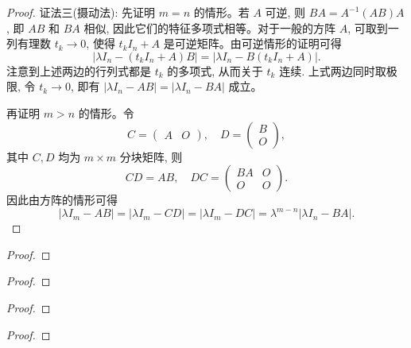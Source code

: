 \documentclass[lang=cn,newtx,10pt,scheme=chinese]{elegantbook}
\begin{document}
\begin{proof}
{\color{blue}证法三(摄动法):} 先证明 \(m = n\) 的情形。若 \(A\) 可逆, 则 \(BA = A^{-1}(AB)A\), 即 \(AB\) 和 \(BA\) 相似, 因此它们的特征多项式相等。对于一般的方阵 \(A\), 可取到一列有理数 \(t_k \to 0\), 使得 \(t_k I_n + A\) 是可逆矩阵。由可逆情形的证明可得
\[
|\lambda I_n - (t_k I_n + A)B| = |\lambda I_n - B(t_k I_n + A)|.
\]
注意到上述两边的行列式都是 \( t_k \) 的多项式, 从而关于 \( t_k \) 连续. 上式两边同时取极限, 令 \( t_k \to 0 \), 即有
\(
|\lambda I_n - AB| = |\lambda I_n - BA|
\)
成立。

再证明 \( m > n \) 的情形。令
\[
C = \begin{pmatrix}
A & O
\end{pmatrix}, \quad D = \begin{pmatrix}
B \\
O
\end{pmatrix},
\]
其中 \( C, D \) 均为 \( m \times m \) 分块矩阵, 则
\[
CD = AB, \quad DC = \begin{pmatrix}
BA & O \\
O & O
\end{pmatrix}.
\]
因此由方阵的情形可得
\[
|\lambda I_m - AB| = |\lambda I_m - CD| = |\lambda I_m - DC| = \lambda^{m-n} |\lambda I_n - BA|.
\]
\end{proof}

\begin{example}

\end{example}
\begin{proof}

\end{proof}

\begin{example}

\end{example}
\begin{proof}

\end{proof}

\begin{example}

\end{example}
\begin{proof}

\end{proof}

\begin{example}

\end{example}
\begin{proof}

\end{proof}
\end{document}
